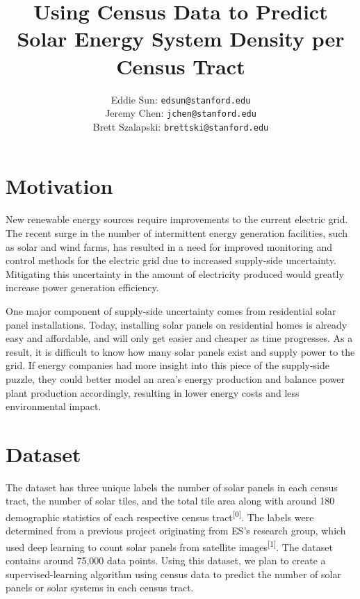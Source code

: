 \documentclass{article}
\title{Using Census Data to Predict Solar Energy System Density per Census Tract}
\author{ Eddie Sun: \texttt{edsun@stanford.edu}\\
  Jeremy Chen: \texttt{jchen@stanford.edu}\\
  Brett Szalapski: \texttt{brettski@stanford.edu}\\
}
\begin{document}
	
	\maketitle


	\section{Motivation}
	
	New renewable energy sources require improvements to the current electric grid. The recent surge in the number of intermittent energy generation facilities, such as solar and wind farms, has resulted in a need for improved monitoring and control methods for the electric grid due to increased supply-side uncertainty. Mitigating this uncertainty in the amount of electricity produced would greatly increase power generation efficiency.
	
	One major component of supply-side uncertainty comes from residential solar panel installations. Today, installing solar panels on residential homes is already easy and affordable, and will only get easier and cheaper as time progresses. As a result, it is difficult to know how many solar panels exist and supply power to the grid. If energy companies had more insight into this piece of the supply-side puzzle, they could better model an area’s energy production and balance power plant production accordingly, resulting in lower energy costs and less environmental impact.
	
	
	
	\section{Dataset}
	\label{dataset}
	
	The dataset has three unique labels \textemdash the number of solar panels in each census tract, the number of solar tiles, and the total tile area \textemdash along with around 180 demographic statistics of each respective census tract\textsuperscript{[0]}. The labels were determined from a previous project originating from ES’s research group, which used deep learning to count solar panels from satellite images\textsuperscript{[1]}. The dataset contains around 75,000 data points. Using this dataset, we plan to create a supervised-learning algorithm using census data to predict the number of solar panels or solar systems in each census tract.
	
\end{document}
